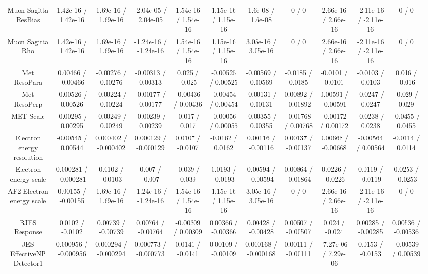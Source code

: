 \begin{table}[htbp]
\begin{center}
\begin{tabular}{|c|c|c|c|c|c|c|c|c|c|c|}
  Muon Sagitta ResBias & 1.42e-16 / 1.42e-16 & 1.69e-16 / 1.69e-16 & -2.04e-05 / 2.04e-05 & 1.54e-16 / 1.54e-16 & 1.15e-16 / 1.15e-16 & 1.6e-08 / 1.6e-08 & 0 / 0 & 2.66e-16 / 2.66e-16 & -2.11e-16 / -2.11e-16 & 0 / 0 \\ 
  Muon Sagitta Rho & 1.42e-16 / 1.42e-16 & 1.69e-16 / 1.69e-16 & -1.24e-16 / -1.24e-16 & 1.54e-16 / 1.54e-16 & 1.15e-16 / 1.15e-16 & 3.05e-16 / 3.05e-16 & 0 / 0 & 2.66e-16 / 2.66e-16 & -2.11e-16 / -2.11e-16 & 0 / 0 \\ 
  Met ResoPara & 0.00466 / -0.00466 & -0.00276 / 0.00276 & -0.00313 / 0.00313 & 0.025 / -0.025 & -0.00525 / 0.00525 & -0.00569 / 0.00569 & -0.0185 / 0.0185 & -0.0101 / 0.0101 & -0.0103 / 0.0103 & 0.016 / -0.016 \\ 
  Met ResoPerp & -0.00526 / 0.00526 & -0.00224 / 0.00224 & -0.00177 / 0.00177 & -0.00436 / 0.00436 & -0.00454 / 0.00454 & -0.00131 / 0.00131 & 0.00892 / -0.00892 & 0.00591 / -0.00591 & -0.0247 / 0.0247 & -0.029 / 0.029 \\ 
  MET Scale & -0.00295 / 0.00295 & -0.00249 / 0.00249 & -0.00239 / 0.00239 & -0.017 / 0.017 & -0.00056 / 0.00056 & -0.00355 / 0.00355 & -0.00768 / 0.00768 & -0.00172 / 0.00172 & -0.0238 / 0.0238 & -0.0455 / 0.0455 \\ 
  Electron energy resolution & -0.00545 / 0.00544 & 0.000402 / -0.000402 & 0.000129 / -0.000129 & 0.0107 / -0.0107 & -0.0162 / 0.0162 & 0.00116 / -0.00116 & 0.00137 / -0.00137 & 0.00668 / -0.00668 & -0.00564 / 0.00564 & -0.0114 / 0.0114 \\ 
  Electron energy scale & 0.000281 / -0.000281 & 0.0102 / -0.0103 & 0.007 / -0.007 & -0.039 / 0.039 & 0.0193 / -0.0193 & 0.00594 / -0.00594 & 0.00864 / -0.00864 & 0.0226 / -0.0226 & 0.0119 / -0.0119 & 0.0253 / -0.0253 \\ 
  AF2 Electron energy scale & 0.00155 / -0.00155 & 1.69e-16 / 1.69e-16 & -1.24e-16 / -1.24e-16 & 1.54e-16 / 1.54e-16 & 1.15e-16 / 1.15e-16 & 3.05e-16 / 3.05e-16 & 0 / 0 & 2.66e-16 / 2.66e-16 & -2.11e-16 / -2.11e-16 & 0 / 0 \\ 
  BJES Response & 0.0102 / -0.0102 & 0.00739 / -0.00739 & 0.00764 / -0.00764 & -0.00309 / 0.00309 & 0.00366 / -0.00366 & 0.00428 / -0.00428 & 0.00507 / -0.00507 & 0.024 / -0.024 & 0.00285 / -0.00285 & 0.00536 / -0.00536 \\ 
  JES EffectiveNP Detector1 & 0.000956 / -0.000956 & 0.000294 / -0.000294 & 0.000773 / -0.000773 & 0.0141 / -0.0141 & 0.00109 / -0.00109 & 0.000168 / -0.000168 & 0.00111 / -0.00111 & -7.27e-06 / 7.29e-06 & 0.0153 / -0.0153 & -0.00539 / 0.00539 \\ 

\end{tabular}
\end{center}
\end{table}
